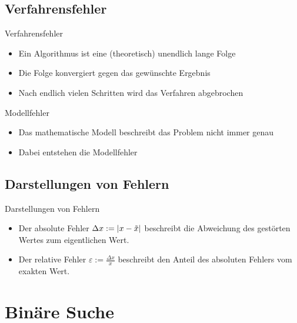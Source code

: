 \documentclass{beamer}
\begin{document}
     \subsection{Verfahrensfehler}  
       \begin{frame}{Verfahrensfehler}
           \begin{itemize}
               \item Ein Algorithmus ist eine (theoretisch) unendlich lange Folge
               \item Die Folge konvergiert gegen das gewünschte Ergebnis
               \item Nach endlich vielen Schritten wird das Verfahren abgebrochen
           \end{itemize}
       \end{frame}

       \begin{frame}{Modellfehler}
           \begin{itemize}
               \item Das mathematische Modell beschreibt das Problem nicht immer genau
               \item Dabei entstehen die Modellfehler
           \end{itemize}
       \end{frame}

     \subsection{Darstellungen von Fehlern}
       \begin{frame}{Darstellungen von Fehlern}
           \begin{itemize}
               \item Der absolute Fehler $\Delta x:=|x- \Tilde{x}|$ beschreibt die Abweichung des gestörten Wertes zum eigentlichen Wert. 
               \item Der relative Fehler $\varepsilon:= \frac{\Delta x}{x}$ beschreibt den Anteil des absoluten Fehlers vom exakten Wert. 
           \end{itemize}
       \end{frame}       

\section{Binäre Suche} 
\end{document}
